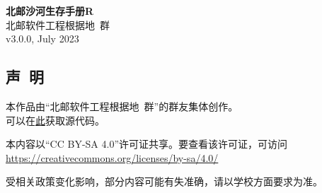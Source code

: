 \documentclass[a4paper]{article}
\begin{document}


\begin{titlepage}
    \centering
    {\Huge\rmfamily\bfseries 北邮沙河生存手册R} \\[6.5ex]
    {\Large\sffamily 北邮软件工程根据地\ 群} \\
    {\large\ttfamily v3.0.0, July 2023}\\[1.5ex]
\end{titlepage}

\begin{titlepage}
    \begin{center}
        \section*{声\ 明}

        本作品由“北邮软件工程根据地\ 群”的群友集体创作。\\
        可以在\href{https://github.com/BUPTSE/welcome}{此}获取源代码。

        \medskip

        本内容以“CC BY-SA 4.0”许可证共享。要查看该许可证，可访问\\
        \href{https://creativecommons.org/licenses/by-sa/4.0/}{https://creativecommons.org/licenses/by-sa/4.0/}

        \medskip

        受相关政策变化影响，部分内容可能有失准确，请以学校方面要求为准。

        \bigskip

    \end{center}

    \tableofcontents
\end{titlepage}

\pagestyle{fancy}
\lhead{\small \leftmark}
\chead{}
\lfoot{}
\cfoot{\thepage}
\rfoot{}
\renewcommand{\headrulewidth}{0.4pt}




















\end{document}
